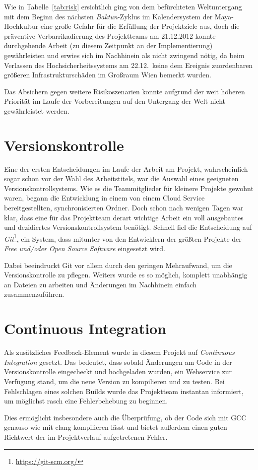 Wie in Tabelle~\ref{tab:risk} ersichtlich ging von dem befürchteten Weltuntergang mit dem Beginn des nächsten \textit{Baktun}-Zyklus im Kalendersystem der Maya-Hochkultur eine große Gefahr für die Erfüllung der Projektziele aus, doch die präventive Verbarrikadierung des Projektteams am 21.12.2012 konnte  durchgehende Arbeit (zu diesem Zeitpunkt an der Implementierung) gewährleisten und erwies sich im Nachhinein als nicht zwingend nötig, da beim Verlassen des Hochsicherheitssystems am 22.12.\ keine dem Ereignis zuordenbaren größeren Infrastrukturschäden im Großraum Wien bemerkt wurden.

Das Absichern gegen weitere Risikoszenarien konnte aufgrund der weit höheren Priorität im Laufe der Vorbereitungen auf den Untergang der Welt nicht gewährleistet werden.

\section{Versionskontrolle}
Eine der ersten Entscheidungen im Laufe der Arbeit am Projekt, wahrscheinlich sogar schon vor der Wahl des Arbeitstitels, war die Auswahl eines geeigneten Versionskontrollsystems. Wie es die Teammitglieder für kleinere Projekte gewohnt waren, begann die Entwicklung in einem von einem Cloud Service bereitgestellten, synchronisierten Ordner. Doch schon nach wenigen Tagen war klar, dass eine für das Projektteam derart wichtige Arbeit ein voll ausgebautes und dezidiertes Versionskontrollsystem benötigt. Schnell fiel die Entscheidung auf \textit{Git}\footnote{\url{https://git-scm.org/}}, ein System, dass mitunter von den Entwicklern der größten Projekte der \textit{Free und/oder Open Source Software} eingesetzt wird.

Dabei beeindruckt Git vor allem durch den geringen Mehraufwand, um die Versionskontrolle zu pflegen. Weiters wurde es so möglich, komplett unabhängig an Dateien zu arbeiten und Änderungen im Nachhinein einfach zusammenzuführen.

\section{Continuous Integration}
Als zusätzliches Feedback-Element wurde in diesem Projekt auf \emph{Continuous Integration} ge\-setzt. Das bedeutet, dass sobald Änderungen am Code in der Versionskontrolle eingecheckt und hochgeladen wurden, ein Webservice zur Verfügung stand, um die neue Version zu kompilieren und zu testen. Bei Fehlschlagen eines solchen Builds wurde das Projektteam instantan informiert, um möglichst rasch eine Fehlerbehebung zu beginnen.

Dies ermöglicht insbesondere auch die Überprüfung, ob der Code sich mit GCC genauso wie mit clang kompilieren lässt und bietet außerdem einen guten Richtwert der im Projektverlauf aufgetretenen Fehler. 
